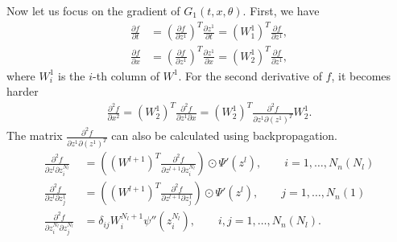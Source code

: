 \documentclass[10pt]{article}
\begin{document}
Now let us focus on the gradient of $G_1(t,x,\theta)$.
First, we have
\begin{align}
	\frac{\partial f}{\partial t} &= \left( \frac{\partial f}{\partial z^1} \right)^T \frac{\partial z^1}{\partial t} = (W^1_1)^T \frac{\partial f}{\partial z^1}, \\
	\frac{\partial f}{\partial x} &= \left( \frac{\partial f}{\partial z^1} \right)^T \frac{\partial z^1}{\partial x} = (W^1_2)^T \frac{\partial f}{\partial z^1},
\end{align}
where $W^1_i$ is the $i$-th column of $W^1$.
For the second derivative of $f$, it becomes harder
\begin{align}
	\frac{\partial^2 f}{\partial x^2} = (W^1_2)^T \frac{\partial^2 f}{\partial z^1 \partial x} = (W_2^1)^T \frac{\partial^2 f}{\partial z^1 \partial (z^1)^T} W_2^1.
\end{align}
The matrix $\frac{\partial^2 f}{\partial z^1 \partial (z^1)^T}$ can also be calculated using backpropagation.
\begin{align}
	\frac{\partial^2 f}{\partial z^l \partial z^{N_l}_i} &= \left( (W^{l+1})^T \frac{\partial^2 f}{\partial z^{l+1} \partial z^{N_l}_i} \right) \odot \Psi'(z^l), \qquad i = 1, \ldots, N_n(N_l) \\
	\frac{\partial^2 f}{\partial z^l \partial z^1_j} &= \left( (W^{l+1})^T \frac{\partial^2 f}{\partial z^{l+1} \partial z^1_j} \right) \odot \Psi'(z^l), \qquad j = 1, \ldots, N_n(1) \\
	\frac{\partial^2 f}{\partial z^{N_l}_i \partial z^{N_l}_j} &= \delta_{ij} W^{N_l+1}_i \psi''(z^{N_l}_i), \qquad i,j = 1,\ldots,N_n(N_l).
\end{align}
\end{document}
